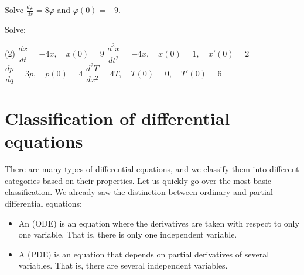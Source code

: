 \begin{exercise}
Solve $\frac{d\varphi}{ds} = 8 \varphi$ and $\varphi(0) = -9$.
\end{exercise}

\begin{exercise}
Solve:
\begin{tasks}(2)
\task $\dfrac{dx}{dt} = -4x, \quad x(0)=9$
\task $\dfrac{d^2x}{dt^2} = -4x, \quad x(0)=1, \quad x'(0)=2$
\task $\dfrac{dp}{dq} = 3 p, \quad p(0)=4$
\task $\dfrac{d^2T}{dx^2} = 4 T, \quad T(0)=0, \quad T'(0)=6$
\end{tasks}
\end{exercise}


\sectionnewpage
\section{Classification of differential equations}
\label{classification:section}


There are many types of differential equations, and we classify them into
different categories based on their properties.  Let us quickly go over
the most basic classification.  We already saw the distinction
between ordinary and partial differential equations:
\begin{itemize}
\item
An \emph{}
(ODE) is an
equation where the derivatives are taken with respect to only one variable.
That is, there is only one independent variable.
\item
A \emph{}
(PDE) is an equation that depends on partial derivatives of several variables.
That is, there are several independent variables.
\end{itemize}

